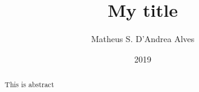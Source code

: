 
\title{My title}
\author{Matheus S. D'Andrea Alves}
\date{2019}
\maketitle

\begin{abstract}
  This is abstract
\end{abstract}

\tableofcontents

